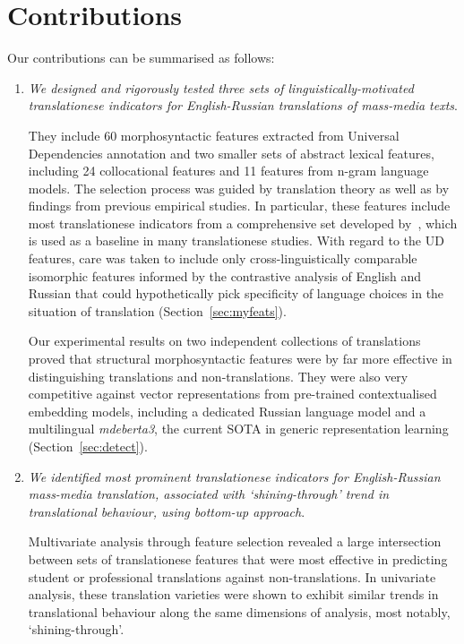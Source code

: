 \section{Contributions}
Our contributions can be summarised as follows: %
\begin{enumerate}\compresslist{}
	\item \textit{We designed and rigorously tested three sets of linguistically-motivated translationese indicators for English-Russian translations of mass-media texts}. 
	
	They include 60 morphosyntactic features extracted from Universal Dependencies annotation and two smaller sets of abstract lexical features, including 24 collocational features and 11 features from n-gram language models. The selection process was guided by translation theory as well as by findings from previous empirical studies. In particular, these features include most translationese indicators from a comprehensive set developed by~\citet{Volansky2015}, which is used as a baseline in many translationese studies. With regard to the UD features, care was taken to include only cross-linguistically comparable isomorphic features informed by the contrastive analysis of English and Russian that could hypothetically pick specificity of language choices in the situation of translation (Section~\ref{sec:myfeats}). 
	
	Our experimental results on two independent collections of translations proved that structural morphosyntactic features were by far more effective in distinguishing translations and non-translations. They were also very competitive against vector representations from pre-trained contextualised embedding models, including a dedicated Russian language model and a multilingual \textit{mdeberta3}, the current SOTA in generic representation learning (Section~\ref{sec:detect}).      
	
	\item \textit{We identified most prominent translationese indicators for English-Russian mass-media translation, associated with `shining-through' trend in translational behaviour, using bottom-up approach}. 
	
	Multivariate analysis through feature selection revealed a large intersection between sets of translationese features that were most effective in predicting student or professional translations against non-translations. In univariate analysis, these translation varieties were shown to exhibit similar trends in translational behaviour along the same dimensions of analysis, most notably, `shining-through'.
	

\end{enumerate}
